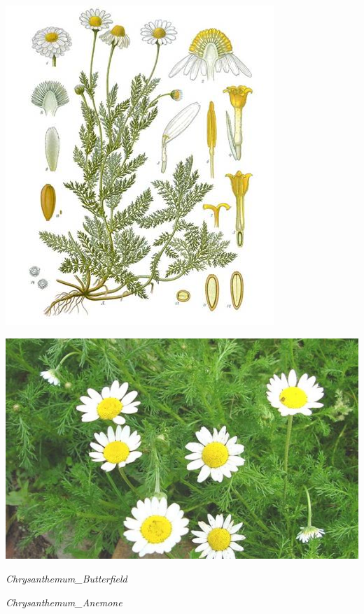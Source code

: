 \documentclass{article}
\begin{document}
\begin{center}
\includegraphics[height=0.9\textheight, angle=90]{../Chamomile.jpg}
\end{center}
\newpage

\begin{center}
\includegraphics[height=0.9\textheight, angle=90]{../chamomile2.jpg}
\end{center}
\newpage

\noindent
\vfill
\centerline{{\Large\emph{Chrysanthemum_Butterfield}}}
\vfill
\newpage

\noindent
\vfill
\centerline{{\Large\emph{Chrysanthemum_Anemone}}}
\vfill
\newpage
\end{document}
